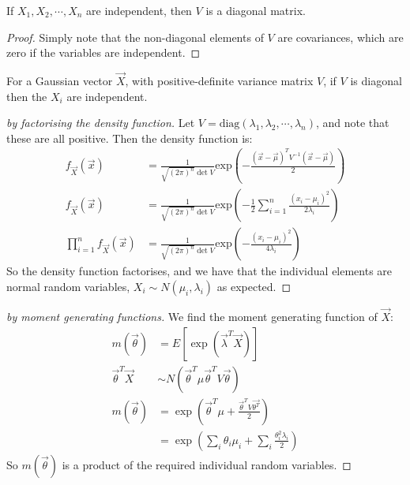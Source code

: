 \documentclass[../Main.tex]{subfiles}
\begin{document}
\begin{proposition}
    If $X_1, X_2, \cdots, X_n$ are independent, then $V$ is a diagonal matrix.
    \label{propDiagonalVariance}
\end{proposition}
\begin{proof}
    Simply note that the non-diagonal elements of $V$ are covariances, which are zero if the variables are independent.
\end{proof}
\begin{lemma}
    For a Gaussian vector $\vec{X}$, with positive-definite variance matrix $V$, if $V$ is diagonal then the $X_i$ are independent.
    \label{lemGaussVecIndepIfZeroCov}
\end{lemma}
\begin{proof}[by factorising the density function]
    Let $V = \text{diag}(\lambda_1, \lambda_2, \cdots, \lambda_n)$, and note that these are all positive. Then the density function is:
    \begin{align*}
        f_{\vec{X}}(\vec{x}) &= \frac{1}{\sqrt{(2\pi)^n} \det{V}} \text{exp} \left(-\frac{(\vec{x} - \vec{\mu})^T V^{-1} (\vec{x} - \vec{\mu})}{2}\right) \\
        f_{\vec{X}}(\vec{x}) &= \frac{1}{\sqrt{(2\pi)^n} \det{V}} \text{exp} \left(-\frac{1}{2} \sum_{i = 1}^n \frac{(x_i - \mu_i)^2}{2\lambda_i}\right) \\
        \prod_{i = 1}^n f_{\vec{X}}(\vec{x}) &= \frac{1}{\sqrt{(2\pi)^n} \det{V}} \text{exp} \left(-\frac{(x_i - \mu_i)^2}{4\lambda_i}\right)
    \end{align*}
    So the density function factorises, and we have that the individual elements are normal random variables, $X_i \sim N(\mu_i, \lambda_i)$ as expected.
\end{proof}
\begin{proof}[by moment generating functions]
    We find the moment generating function of $\vec{X}$:
    \begin{align*}
        m(\vec{\theta}) &= E[\exp(\vec{\lambda}^T \vec{X})] \\
        \vec{\theta}^T\vec{X} &\sim N(\vec{\theta}^T \mu \vec{\theta}^T V \vec{\theta}) \\
        m(\vec{\theta}) &= \exp\left(\vec{\theta}^T \mu + \frac{\vec{\theta}^T V \vec{\theta^T}}{2}\right) \\
        &= \exp\left(\sum_i \theta_i \mu_i + \sum_i \frac{\theta_i^2 \lambda_i}{2}\right)
    \end{align*}
    So $m(\vec{\theta})$ is a product of the required individual random variables.
\end{proof}
\end{document}
